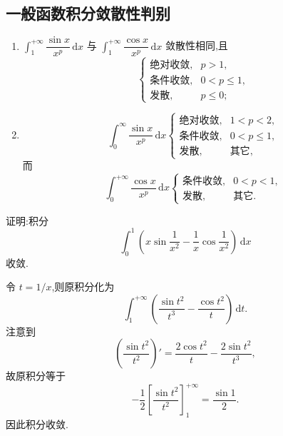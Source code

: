 \subsection{一般函数积分敛散性判别}

\begin{proposition}[\markstar]
  \leavevmode
  \begin{enumerate}
    \item $\displaystyle\int_1^{+\infty}\dfrac{\sin x}{x^p}\,\mathrm{d}x$ 与 $\displaystyle\int_1^{+\infty}\dfrac{\cos x}{x^p}\,\mathrm{d}x$ 敛散性相同,且
          \[
            \begin{cases}
              \text{绝对收敛}, & p>1,      \\
              \text{条件收敛}, & 0<p\leq1, \\
              \text{发散},   & p\leq0;
            \end{cases}
          \]
    \item
          \[
            \displaystyle\int_0^\infty\dfrac{\sin x}{x^p}\,\mathrm{d}x
            \begin{cases}
              \text{绝对收敛}, & 1<p<2,     \\
              \text{条件收敛}, & 0<p\leq1,  \\
              \text{发散},   & \text{其它},
            \end{cases}
          \]
          而
          \[
            \displaystyle\int_0^{+\infty}\dfrac{\cos x}{x^p}\,\mathrm{d}x
            \begin{cases}
              \text{条件收敛}, & 0<p<1,     \\
              \text{发散},   & \text{其它}.
            \end{cases}
          \]
  \end{enumerate}
\end{proposition}

\begin{example}
  证明:积分
  \[
    \displaystyle\int_0^1\left(x\sin\dfrac{1}{x^2}-\dfrac{1}{x}\cos\dfrac{1}{x^2}\right)\,\mathrm{d}x
  \]
  收敛.
\end{example}
\exampleblank

\begin{solution}
  令 $t=1/x$,则原积分化为
  \[
    \displaystyle\int_1^{+\infty}\left(\dfrac{\sin t^2}{t^3}-\dfrac{\cos t^2}{t}\right)\,\mathrm{d}t.
  \]
  注意到
  \[
    \left(\dfrac{\sin t^2}{t^2}\right)'
    =\dfrac{2\cos t^2}{t}-\dfrac{2\sin t^2}{t^3},
  \]
  故原积分等于
  \[
    -\dfrac{1}{2}\left[\dfrac{\sin t^2}{t^2}\right]_1^{+\infty}
    =\dfrac{\sin1}{2}.
  \]
  因此积分收敛.
\end{solution}

